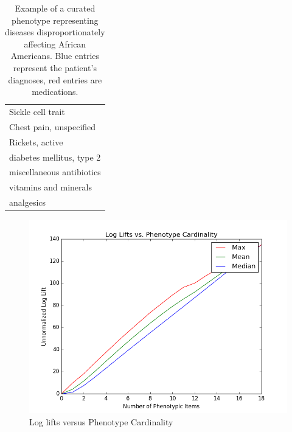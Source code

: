 \documentclass{sig-alternate-05-2015}
\newcommand{\kibitz}[2]{\ifnum\Comments=1\textcolor{#1}{#2}\fi}
\newcommand{\joyce}[1]{\kibitz{purple}      {[Joyce: #1]}}
\newcommand{\jette}[1]{\kibitz{red}      {[Jette: #1]}}
\begin{document}
\begin{table}
\begin{center}
\begin{tabular}{l}
\toprule
\color{blue}Sickle cell trait \\
\color{blue}Chest pain, unspecified \\
\color{blue}Rickets, active \\ 
\color{blue}diabetes mellitus, type 2 \\ 
\color{red}miscellaneous antibiotics \\ 
\color{red}vitamins and minerals \\ 
\color{red}analgesics \\
\bottomrule
\end{tabular}
\end{center}
\caption{Example of a curated phenotype representing diseases disproportionately affecting African Americans. Blue entries represent the patient's diagnoses, red entries are medications.}
\label{tab:curated-pheno-example}
\end{table}



\begin{figure} [t]
\centering
\includegraphics[width=\linewidth]{logLiftsAcrossPhenoCard_MMM_kho.png}
\caption{Log lifts versus Phenotype Cardinality}
\label{fig:log-lift}
\end{figure}
\end{document}
